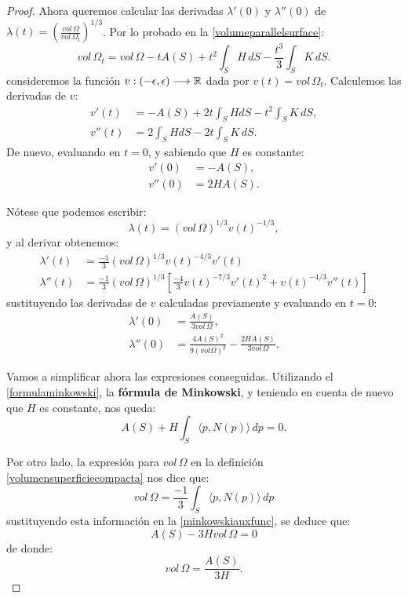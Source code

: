 \begin{proof}
Ahora queremos calcular las derivadas $\lambda'(0)$ y $\lambda''(0)$ de $\lambda(t) = \left( \frac{vol \, \Omega}{vol \, \Omega_t} \right) ^{1/3}$. Por lo probado en la \autoref{volumeparallelsurface}:
%
\begin{equation*}
    vol \, \Omega_t = vol \, \Omega - tA(S) + t^2\int_S H \, dS - \frac{t^3}{3}\int_S K \, dS.
\end{equation*}
%
consideremos la función $v: (-\epsilon, \epsilon) \longrightarrow \mathbb{R}$ dada por $v(t) = vol \, \Omega_t$. Calculemos las derivadas de $v$:
%
\begin{align*}
    v'(t) &= - A(S) + 2t\int_S HdS - t^2\int_S K \, dS, \\
    v''(t) &= 2\int_{S} HdS - 2t\int_S K \, dS.
\end{align*}
%
De nuevo, evaluando en $t=0$, y sabiendo que $H$ es constante:
%
\begin{align*}
    v'(0) &= -A(S), \\
    v''(0) &= 2HA(S).
\end{align*}

Nótese que podemos escribir:
%
\begin{equation*}
    \lambda(t) = (vol \, \Omega)^{1/3} v(t)^{-1/3},
\end{equation*}
%
y al derivar obtenemos:
%
\begin{align*}
    \lambda'(t) &= \frac{-1}{3} (vol \, \Omega)^{1/3} v(t)^{-4/3} v'(t) \\
    \lambda''(t) &= \frac{-1}{3} (vol \, \Omega)^{1/3} \left[ \frac{-4}{3}v(t)^{-7/3} v'(t)^2 + v(t)^{-4/3}v''(t) \right]
\end{align*}
%
sustituyendo las derivadas de $v$ calculadas previamente y evaluando en $t=0$:
%
\begin{align*}
    \lambda'(0) &= \frac{A(S)}{3 vol \, \Omega}, \\
    \lambda''(0) &= \frac{4 A(S)^2}{9 (vol\Omega)^{2}} - \frac{2HA(S)}{3 vol \, \Omega} .
\end{align*}

Vamos a simplificar ahora las expresiones conseguidas. Utilizando el \autoref{formulaminkowski}, la \textbf{fórmula de Minkowski}, y teniendo en cuenta de nuevo que $H$ es constante, nos queda:
%
\begin{equation}\label{minkowskiauxfunc}
    A(S) + H\int_S \langle p, N(p) \rangle \, dp = 0.
\end{equation}

Por otro lado, la expresión para $vol \, \Omega$ en la definición \autoref{volumensuperficiecompacta} nos dice que:
%
\begin{equation*}
    vol \, \Omega = \frac{-1}{3}\int_S \langle p, N(p) \rangle \, dp
\end{equation*}
%
sustituyendo esta información en la \autoref{minkowskiauxfunc}, se deduce que:
%
\begin{equation*}
    A(S) - 3H vol \, \Omega = 0
\end{equation*}
%
de donde:
%
\begin{equation*}
    vol \, \Omega = \frac{A(S)}{3H}.
\end{equation*}


\end{proof}
